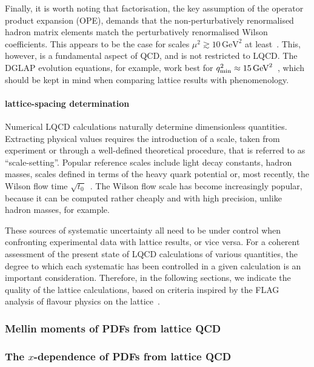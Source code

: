 Finally, it is worth noting that factorisation, the key assumption of the operator product expansion (OPE), demands that the non-perturbatively renormalised hadron matrix elements match the perturbatively renormalised Wilson coefficients. This appears to be the case for scales $\mu^2 \gtrsim 10 \, \mbox{GeV}^2$ at least~\cite{Gockeler:2010yr}. This, however, is a fundamental aspect of QCD, and is not restricted to LQCD. The DGLAP evolution equations, for example, work best for $q^2_{\rm min} \approx 15 \, \mbox{GeV}^2$~\cite{Abramowicz:2015mha}, which should be kept in mind when comparing lattice results with phenomenology.

\paragraph{lattice-spacing determination} Numerical LQCD calculations naturally determine dimensionless quantities. Extracting physical values requires the introduction of a scale, taken from experiment or through a well-defined theoretical procedure, that is referred to as ``scale-setting''. Popular reference scales include light decay constants, hadron masses, scales defined in terms of the heavy quark potential or, most recently, the Wilson flow time $\sqrt{t_0}$~\cite{Luscher:2010iy}. The Wilson flow scale has become increasingly popular, because it can be computed rather cheaply and with high precision, unlike hadron masses, for example.

These sources of systematic uncertainty all need to be under control when confronting experimental data with lattice results, or vice versa. For a coherent assessment of the present state of LQCD calculations of various quantities, the degree to which each systematic has been controlled in a given calculation is an important consideration. Therefore, in the following sections, we indicate the quality of the lattice calculations, based on criteria inspired by the FLAG analysis of flavour physics on the lattice~\cite{Aoki:2016frl}.

\subsubsection{Mellin moments of PDFs from lattice QCD}
\label{Sec:MomentsLQCD}


\subsubsection{The $x$-dependence of PDFs from lattice QCD}

